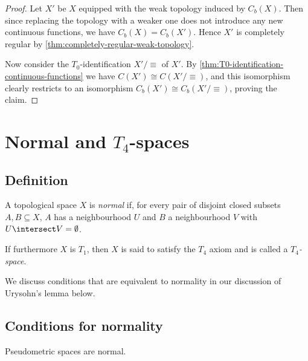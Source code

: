\documentclass[article, a4paper, 11pt, oneside]{memoir}
\numberwithin{equation}{chapter}
\begin{document}
\begin{proof}
    Let $X'$ be $X$ equipped with the weak topology induced by $C_b(X)$. Then since replacing the topology with a weaker one does not introduce any new continuous functions, we have $C_b(X) = C_b(X')$. Hence $X'$ is completely regular by \cref{thm:completely-regular-weak-topology}.

    Now consider the $T_0$-identification $X'/{\equiv}$ of $X'$. By \cref{thm:T0-identification-continuous-functions} we have $C(X') \cong C(X'/{\equiv})$, and this isomorphism clearly restricts to an isomorphism $C_b(X') \cong C_b(X'/{\equiv})$, proving the claim.
\end{proof}



\chapter[Normal and T4-spaces]{Normal and $T_4$-spaces}

\section{Definition}

\begin{definition}
    A topological space $X$ is \emph{normal} if, for every pair of disjoint closed subsets $A,B \subseteq X$, $A$ has a neighbourhood $U$ and $B$ a neighbourhood $V$ with $U \intersect V = \emptyset$.

    If furthermore $X$ is $T_1$, then $X$ is said to satisfy the $T_4$ axiom and is called a \emph{$T_4$-space}.
\end{definition}

We discuss conditions that are equivalent to normality in our discussion of Urysohn's lemma below.


\section{Conditions for normality}

\begin{proposition}
    \label{thm:metric-space-normal}
    Pseudometric spaces are normal.
\end{proposition}
\end{document}
